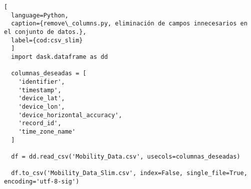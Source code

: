 \begin{lstlisting}[
  language=Python,
  caption={remove\_columns.py, eliminación de campos innecesarios en el conjunto de datos.},
  label={cod:csv_slim}
  ]
  import dask.dataframe as dd

  columnas_deseadas = [
    'identifier',
    'timestamp',
    'device_lat',
    'device_lon',
    'device_horizontal_accuracy',
    'record_id',
    'time_zone_name'
  ]

  df = dd.read_csv('Mobility_Data.csv', usecols=columnas_deseadas)

  df.to_csv('Mobility_Data_Slim.csv', index=False, single_file=True, encoding='utf-8-sig')
\end{lstlisting}
\vfill

